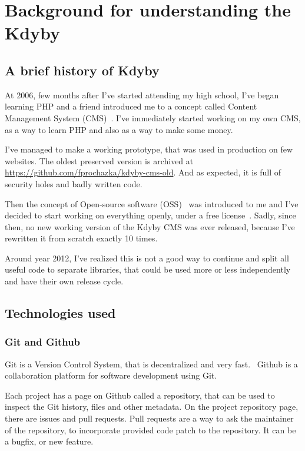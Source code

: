 \chapter{Background for understanding the Kdyby}

\section{A brief history of Kdyby} \label{sec:theory:kdyby-history}

At 2006, few months after I've started attending my high school, I've began learning PHP and a friend introduced me to a concept called Content Management System (CMS)~\cite{wiki:cms}. I've immediately started working on my own CMS, as a way to learn PHP and also as a way to make some money.

I've managed to make a working prototype, that was used in production on few websites. The oldest preserved version is archived at \url{https://github.com/fprochazka/kdyby-cms-old}. And as expected, it is full of security holes and badly written code.

Then the concept of Open-source software (OSS)~\cite{wiki:oss} was introduced to me and I've decided to start working on everything openly, under a free license~\cite{wiki:fsl}. Sadly, since then, no new working version of the Kdyby CMS was ever released, because I've rewritten it from scratch exactly 10 times.

Around year 2012, I've realized this is not a good way to continue and split all useful code to separate libraries, that could be used more or less independently and have their own release cycle.

\section{Technologies used}

\subsection{Git and Github} \label{sec:theory:git}

Git is a Version Control System, that is decentralized and very fast.~\cite{progit} Github is a collaboration platform for software development using Git.

Each project has a page on Github called a repository, that can be used to inspect the Git history, files and other metadata. On the project repository page, there are issues and pull requests. Pull requests are a way to ask the maintainer of the repository, to incorporate provided code patch to the repository. It can be a bugfix, or new feature.


